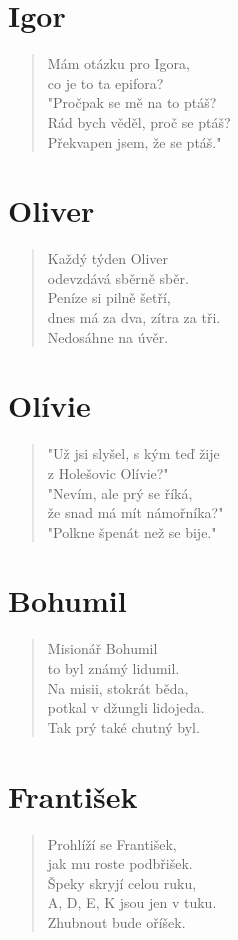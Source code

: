 \section*{Igor}
\begin{verse}
Mám otázku pro Igora,\\
co je to ta epifora?\\
"Pročpak se mě na to ptáš?\\
Rád bych věděl, proč se ptáš?\\
Překvapen jsem, že se ptáš."
\end{verse}

\section*{Oliver}
\begin{verse}
Každý týden Oliver\\
odevzdává sběrně sběr.\\
Peníze si pilně šetří,\\
dnes má za dva, zítra za tři.\\
Nedosáhne na úvěr.
\end{verse}

\section*{Olívie}
\begin{verse}
"Už jsi slyšel, s kým teď žije\\
z Holešovic Olívie?"\\
"Nevím, ale prý se říká,\\
že snad má mít námořníka?"\\
"Polkne špenát než se bije."
\end{verse}

\section*{Bohumil}
\begin{verse}
Misionář Bohumil\\
to byl známý lidumil.\\
Na misii, stokrát běda,\\
potkal v džungli lidojeda.\\
Tak prý také chutný byl.
\end{verse}

\section*{František}
\begin{verse}
Prohlíží se František,\\
jak mu roste podbřišek.\\
Špeky skryjí celou ruku,\\
A, D, E, K jsou jen v tuku.\\
Zhubnout bude oříšek.
\end{verse}

